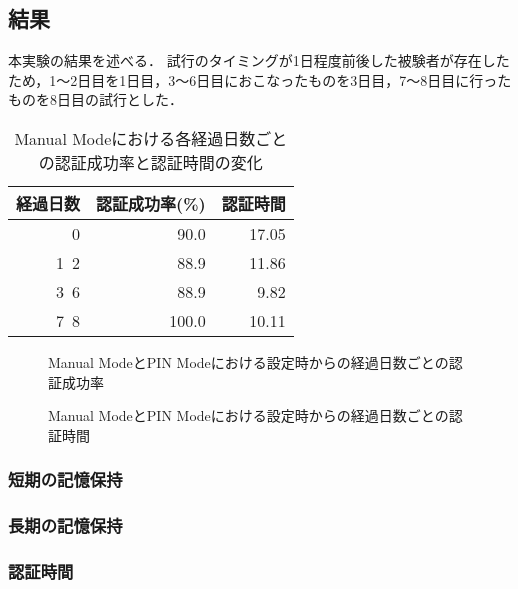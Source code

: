 \subsection{結果}
本実験の結果を述べる．
試行のタイミングが1日程度前後した被験者が存在したため，1〜2日目を1日目，3〜6日目におこなったものを3日目，7〜8日目に行ったものを8日目の試行とした．
\begin{table}[ht]
  \begin{center}
    \small
    \begin{tabular}{|r|r|r|} \hline
      経過日数 & 認証成功率(\%) & 認証時間\\ \hline
      0 & 90.0 & 17.05 \\
      1~2 & 88.9 & 11.86 \\
      3~6 & 88.9 & 9.82 \\
      7~8 & 100.0 & 10.11 \\ \hline
    \end{tabular}
  \end{center}
  \caption{Manual Modeにおける各経過日数ごとの認証成功率と認証時間の変化}
  \label{tab:manual.data}
\end{table}

\begin{figure}[ht]
  \begin{center}
  \end{center}
  \caption{Manual ModeとPIN Modeにおける設定時からの経過日数ごとの認証成功率}
  \label{fig:ex_manual_vs_pin_rate}
\end{figure}

\begin{figure}[ht]
  \begin{center}
  \end{center}
  \caption{Manual ModeとPIN Modeにおける設定時からの経過日数ごとの認証時間}
  \label{fig:ex_manual_vs_pin_time}
\end{figure}

\subsubsection{短期の記憶保持}


\subsubsection{長期の記憶保持}


\subsubsection{認証時間}



